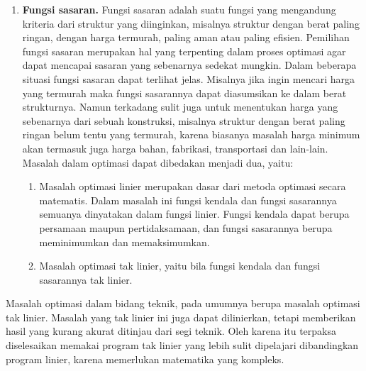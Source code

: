 \begin{enumerate}[label=\arabic*.]
\begin{enumerate}[label=\alph*.]
      \end{enumerate}
\item \textbf{Fungsi sasaran.} Fungsi sasaran adalah suatu fungsi yang
      mengandung kriteria dari struktur yang diinginkan, misalnya
      struktur dengan berat paling ringan, dengan harga termurah, paling
      aman atau paling efisien. Pemilihan fungsi sasaran merupakan hal
      yang terpenting dalam proses optimasi agar dapat mencapai sasaran
      yang sebenarnya sedekat mungkin. Dalam beberapa situasi fungsi
      sasaran dapat terlihat jelas. Misalnya jika ingin mencari harga
      yang termurah maka fungsi sasarannya dapat diasumsikan ke dalam
      berat strukturnya. Namun terkadang sulit juga untuk menentukan
      harga yang sebenarnya dari sebuah konstruksi, misalnya struktur
      dengan berat paling ringan belum tentu yang termurah, karena
      biasanya masalah harga minimum akan termasuk juga harga bahan,
      fabrikasi, transportasi dan lain-lain. Masalah dalam optimasi dapat
      dibedakan menjadi dua, yaitu:
      \begin{enumerate}[label=\alph*.]
      \item Masalah optimasi linier merupakan dasar dari metoda optimasi
            secara matematis. Dalam masalah ini fungsi kendala dan fungsi
            sasarannya semuanya dinyatakan dalam fungsi linier. Fungsi
            kendala dapat berupa persamaan maupun pertidaksamaan, dan
            fungsi sasarannya berupa meminimumkan dan memaksimumkan.
      \item Masalah optimasi tak linier, yaitu bila fungsi kendala dan
            fungsi sasarannya tak linier.
      \end{enumerate}
\end{enumerate}

Masalah optimasi dalam bidang teknik, pada umumnya berupa masalah
optimasi tak linier. Masalah yang tak linier ini juga dapat dilinierkan,
tetapi memberikan hasil yang kurang akurat ditinjau dari segi teknik.
Oleh karena itu terpaksa diselesaikan memakai program tak linier yang
lebih sulit dipelajari dibandingkan program linier, karena memerlukan
matematika yang kompleks.


